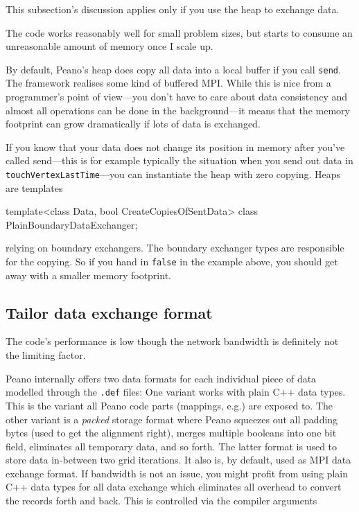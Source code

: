 This subsection's discussion applies only if you use the heap to exchange data.

\begin{smell}
  The code works reasonably well for small problem sizes, but starts to consume 
  an unreasonable amount of memory once I scale up.
\end{smell}

\noindent
By default, Peano's heap does copy all data into a local buffer if you call \texttt{send}.
The framework realises some kind of buffered MPI.
While this is nice from a programmer's point of view---you don't have to care about
data consistency and almost all operations can be done in the background---it means
that the memory footprint can grow dramatically if lots of data is exchanged.


If you know that your data does not change its position in memory after you've 
called send---this is for example typically the situation when you send out data in 
\texttt{touchVertexLastTime}---you can instantiate the heap with zero copying.
Heaps are templates
\begin{code}
template<class Data, bool CreateCopiesOfSentData>
class PlainBoundaryDataExchanger;
\end{code} 
relying on boundary exchangers. The boundary exchanger types are responsible 
for the copying. 
So if you hand in \texttt{false} in the example above, you should get away
with a smaller memory footprint.




\subsection{Tailor data exchange format}
\label{section:advanced-mpi:tailor-data-exchange-format}

\begin{smell}
 The code's performance is low though the network bandwidth is definitely not
 the limiting factor.
\end{smell}


Peano internally offers two data formats for each individual piece of data
modelled through the \texttt{.def} files:
One variant works with plain C++ data types. 
This is the variant all Peano code parts (mappings, e.g.) are exposed to.
The other variant is a {\em packed} storage format where Peano squeezes out
all padding bytes (used to get the alignment right), merges multiple booleans
into one bit field, eliminates all temporary data, and so forth.
The latter format is used to store data in-between two grid iterations.
It also is, by default, used as MPI data exchange format.
If bandwidth is not an issue, you might profit from using plain C++ data types
for all data exchange which eliminates all overhead to convert the records forth
and back.
This is controlled via the compiler arguments

